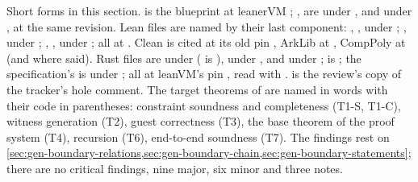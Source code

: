 \begin{sloppypar}
Short forms in this section.  is the blueprint
 at leanerVM ; ,
 are under ,  and
 under , at the same revision. Lean files are named by
their last component: , ,  under
; ,  under
; , ,
 under ; all at . Clean is
cited at its old pin , ArkLib at , CompPoly at 
(and  where said). Rust files are under 
( is ),  under ,
 and  under ;
 is ; the specification's
 is under ; all at leanVM's pin
, read with .  is the review's copy of the
tracker's hole comment. The target theorems of  are named in words with
their code in parentheses: constraint soundness and completeness (T1-S, T1-C), witness generation
(T2), guest correctness (T3), the base theorem of the proof system (T4), recursion (T6),
end-to-end soundness (T7). The findings rest on
\cref{sec:gen-boundary-relations,sec:gen-boundary-chain,sec:gen-boundary-statements}; there are
no critical findings, nine major, six minor and three notes.
\end{sloppypar}

